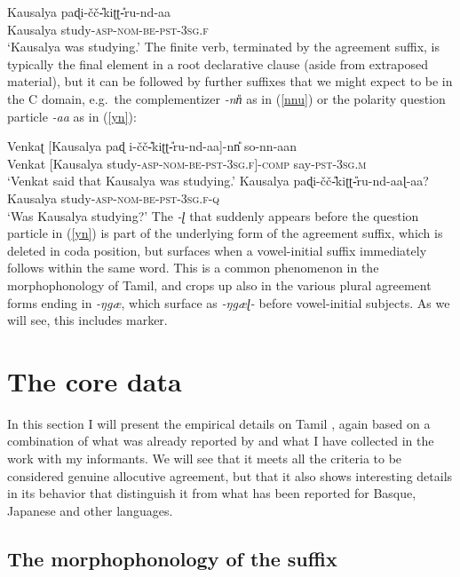 \documentclass[output=paper, modfonts, nonflat]{langsci/langscibook}
\begin{document}
\ea\label{prog}\gll Kausalya paɖi-\v{c}\v{c}\U-kiʈʈ\U-ru-nd-aa\\
Kausalya study-\textsc{asp}-\textsc{nom}-\textsc{be}-\textsc{pst}-3\textsc{sg.f}\\
\glt `Kausalya was studying.'
\z
%
The finite verb, terminated by the agreement suffix, is typically the
final element in a root declarative clause (aside from extraposed
material), but it can be followed by further suffixes that we might
expect to be in the C domain, e.g.\ the complementizer \textit{-nn\U}
as in (\ref{nnu}) or the polarity question particle \textit{-aa} as in
(\ref{yn}):

\ea
  \ea\label{nnu}\gll Venkaʈ [Kausalya paɖ
  i-\v{c}\v{c}\U-kiʈʈ\U-ru-nd-aa]-nn\U{} so-nn-aan\\
  Venkat [Kausalya
  study-\textsc{asp}-\textsc{nom}-\textsc{be}-\textsc{pst}-3\textsc{sg.f}]-\textsc{comp}{}
  say-\textsc{pst}-3\textsc{sg.m}\\
  \glt `Venkat said that Kausalya was studying.'
  \ex\label{yn}\gll Kausalya paɖi-\v{c}\v{c}\U-kiʈʈ\U-ru-nd-aaɭ-aa?\\
  Kausalya study-\textsc{asp}-\textsc{nom}-\textsc{be}-\textsc{pst}-3\textsc{sg.f}-\textsc{q}\\
  \glt `Was Kausalya studying?'
  \z
\z
%
The \textit{-ɭ} that suddenly appears before the question particle in
(\ref{yn}) is part of the underlying form of the agreement suffix,
which is deleted in coda position, but surfaces when a vowel-initial
suffix immediately follows within the same word. This is a common
phenomenon in the morphophonology of Tamil, and crops up also in the
various plural agreement forms ending in \textit{-ŋgæ}, which surface
as \textit{-ŋgæɭ-} before vowel-initial subjects. As we will see,
this includes \allagr{} marker.


\section{The core data}

In this section I will present the empirical details on Tamil \allagr,
again based on a combination of what was already reported by
\citet{amrit:1991} and what I have collected in the work with my
informants. We will see that it meets all the criteria to be
considered genuine allocutive agreement, but that it also shows
interesting details in its behavior that distinguish it from what has
been reported for Basque, Japanese and other languages.

\subsection{The morphophonology of the suffix}
\end{document}
